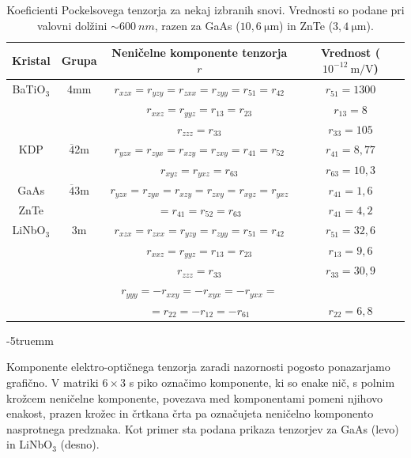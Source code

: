 \begin{table}[ht]
 \centering
\begin{tabular}{|c|c|c|c|} \hline  
      Kristal & Grupa & Neničelne komponente tenzorja $r$ & Vrednost ($10^{-12}~\si{\m/\V}$)\\ \hline
      BaTiO$_3$\index{BaTiO$_3$} & 4mm & $r_{xzx} = r_{yzy} = r_{zxx} = r_{zyy} = 
      r_{51} = r_{42}$  &
	    $r_{51} = 1300$ \\
	      & & $r_{xxz} = r_{yyz} = r_{13} = r_{23}$ &  $r_{13} = 8$ \\
	      & & $r_{zzz} = r_{33}$ & $r_{33} = 105$ \\ \hline
      KDP\index{KDP} & 
      $\overline{4}$2m & $r_{yzx} = r_{zyx} = r_{xzy} = r_{zxy} = r_{41} = r_{52}$  &
	    $r_{41} = 8,77$ \\
	    & & $r_{xyz} = r_{yxz} = r_{63}$ &  $r_{63} = 10,3$ \\ \hline
      GaAs\index{GaAs}\index{ZnTe} &  $\overline{4}$3m&
	  $r_{yzx} = r_{zyx} = r_{xzy} = r_{zxy} = r_{xyz} = r_{yxz}$  & 
	   $r_{41} = 1,6$ \\
	ZnTe  & &   $= r_{41} = r_{52}=r_{63}$  & $r_{41} = 4,2$ 
	    \\ \hline
      LiNbO$_3$\index{LiNbO$_3$} & 3m & $r_{xzx} = r_{zxx} = r_{yzy} = r_{zyy} = r_{51} = r_{42}$  &
	    $r_{51} = 32,6$ \\
	     & & $r_{xxz} = r_{yyz} = r_{13} = r_{23}$ &  $r_{13} = 9,6$ \\
	      & & $r_{zzz} = r_{33}$ & $r_{33} = 30,9$ \\
	    & &  $r_{yyy} = - r_{xxy} = -r_{xyx} = -r_{yxx}  = $ & \\
	    & &  $=r_{22} =  -r_{12} =-r_{61} $  &
	    $r_{22}  = 6,8$ \\
\hline 
\end{tabular}
  \caption{Koeficienti Pockelsovega tenzorja za nekaj izbranih snovi. Vrednosti so podane 
  pri valovni dolžini $\sim 600~\si{nm}$, razen za GaAs ($10,6~\si{\micro\metre}$) in 
  ZnTe ($3,4~\si{\micro\metre}$).}
\label{table:Pockels}
\end{table}
\vglue-5truemm
\begin{remark}
Komponente elektro-optičnega tenzorja zaradi nazornosti pogosto ponazarjamo grafično. V matriki $6\times 3$
s piko označimo komponente, ki so enake nič, s polnim krožcem neničelne komponente, povezava med 
komponentami pomeni njihovo enakost, prazen krožec in črtkana črta pa označujeta 
neničelno komponento nasprotnega predznaka. Kot primer sta podana prikaza tenzorjev za 
GaAs (levo) in  LiNbO$_3$ (desno).
\begin{figure}[ht]
\centering
\def\svgwidth{20truemm} 
\qquad \qquad
\def\svgwidth{20truemm} 

\end{figure}
\end{remark}

